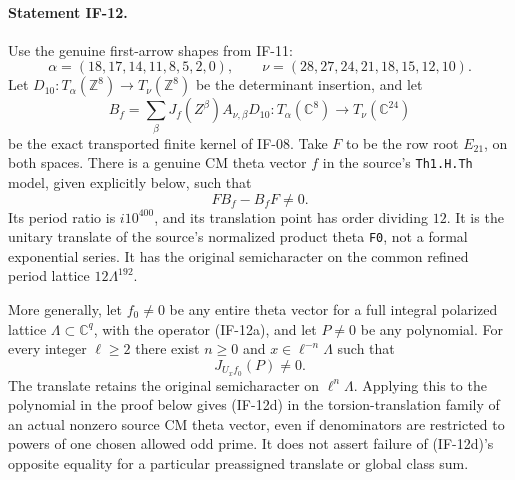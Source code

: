 \paragraph{Statement IF-12.}
Use the genuine first-arrow shapes from IF-11:
\[
 \alpha=(18,17,14,11,8,5,2,0),\qquad
 \nu=(28,27,24,21,18,15,12,10).
\]
Let $D_{10}:T_\alpha(\mathbb Z^8)\longrightarrow
T_\nu(\mathbb Z^8)$ be the determinant insertion, and let
\[
 B_f=\sum_\beta J_f(Z^\beta)A_{\nu,\beta}D_{10}:
 T_\alpha(\mathbb C^8)\longrightarrow T_\nu(\mathbb C^{24})
                                                               \tag{IF-12c}
\]
be the exact transported finite kernel of IF-08. Take $F$ to be the
row root $E_{21}$, on both spaces. There is a genuine CM theta vector
$f$ in the source's \texttt{Th1.H.Th} model, given explicitly below,
such that
\[
                 F B_f-B_f F\ne0.                            \tag{IF-12d}
\]
Its period ratio is $i10^{400}$, and its translation point has order
dividing $12$. It is the unitary translate of the source's normalized
product theta \texttt{F0}, not a formal exponential series. It has
the original semicharacter on the common refined period lattice
$12\Lambda^{192}$.

More generally, let $f_0\ne0$ be any entire theta vector for a full
integral polarized lattice $\Lambda\subset\mathbb C^q$, with the
operator (IF-12a), and let $P\ne0$ be any polynomial. For every
integer $\ell\ge2$ there exist $n\ge0$ and
$x\in\ell^{-n}\Lambda$ such that
\[
                         J_{U_xf_0}(P)\ne0.                  \tag{IF-12e}
\]
The translate retains the original semicharacter on
$\ell^n\Lambda$. Applying this to the polynomial in the proof
below gives (IF-12d) in the torsion-translation family of an actual
nonzero source CM theta vector, even if denominators are restricted
to powers of one chosen allowed odd prime. It does not assert failure
of (IF-12d)'s opposite equality for a particular preassigned translate
or global class sum.

